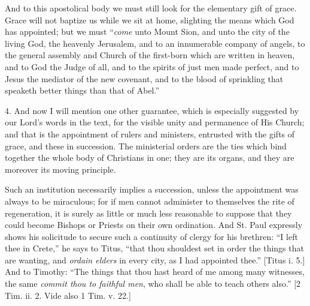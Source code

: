 And to this apostolical body we must still look for the elementary
gift of grace. Grace will not baptize us while we sit at home,
slighting the means which God has appointed; but we must ``\emph{come}
unto Mount Sion, and unto the city of the living God, the heavenly
Jerusalem, and to an innumerable company of angels, to the general
assembly and Church of the first-born which are written in heaven, and
to God the Judge of all, and to the spirits of just men made perfect,
and to Jesus the mediator of the new covenant, and to the blood of
sprinkling that speaketh better things than that of Abel.''

4. And now I will mention one other guarantee, which is especially
suggested by our Lord's words in the text, for the visible unity and
permanence of His Church; and that is the appointment of rulers and
ministers, entrusted with the gifts of grace, and these in succession.
The ministerial orders are the ties which bind together the whole body
of Christians in one; they are its organs, and they are moreover its
moving principle.

Such an institution necessarily implies a succession, unless the
appointment was always to be miraculous; for if men cannot administer
to themselves the rite of regeneration, it is surely as little or much
less reasonable to suppose that they could become Bishops or Priests
on their own ordination. And St. Paul expressly shows his solicitude
to secure such a continuity of clergy for his brethren: ``I left
thee in Crete,'' he says to Titus, ``that thou shouldest set
in order the things that are wanting, and \emph{ordain elders} in
every city, as I had appointed thee.'' [Titus i. 5.] And to
Timothy: ``The things that thou hast heard of me among many
witnesses, the same \emph{commit thou to faithful men}, who shall be
able to teach others also.'' [2 Tim. ii. 2. Vide also 1 Tim. v.
22.]

